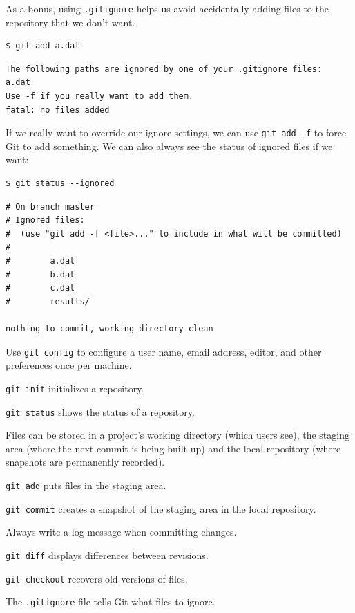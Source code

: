 \documentclass{book}
\begin{document}
As a bonus, using \texttt{.gitignore} helps us avoid accidentally adding
files to the repository that we don't want.

\begin{verbatim}
$ git add a.dat
\end{verbatim}

\begin{verbatim}
The following paths are ignored by one of your .gitignore files:
a.dat
Use -f if you really want to add them.
fatal: no files added
\end{verbatim}

If we really want to override our ignore settings, we can use
\texttt{git add -f} to force Git to add something. We can also always
see the status of ignored files if we want:

\begin{verbatim}
$ git status --ignored
\end{verbatim}

\begin{verbatim}
# On branch master
# Ignored files:
#  (use "git add -f <file>..." to include in what will be committed)
#
#        a.dat
#        b.dat
#        c.dat
#        results/

nothing to commit, working directory clean
\end{verbatim}

\begin{keypoints}
\begin{swcitemize}
\item
  Use \texttt{git config} to configure a user name, email address,
  editor, and other preferences once per machine.
\item
  \texttt{git init} initializes a repository.
\item
  \texttt{git status} shows the status of a repository.
\item
  Files can be stored in a project's working directory (which users
  see), the staging area (where the next commit is being built up) and
  the local repository (where snapshots are permanently recorded).
\item
  \texttt{git add} puts files in the staging area.
\item
  \texttt{git commit} creates a snapshot of the staging area in the
  local repository.
\item
  Always write a log message when committing changes.
\item
  \texttt{git diff} displays differences between revisions.
\item
  \texttt{git checkout} recovers old versions of files.
\item
  The \texttt{.gitignore} file tells Git what files to ignore.
\end{swcitemize}
\end{keypoints}
\end{document}
